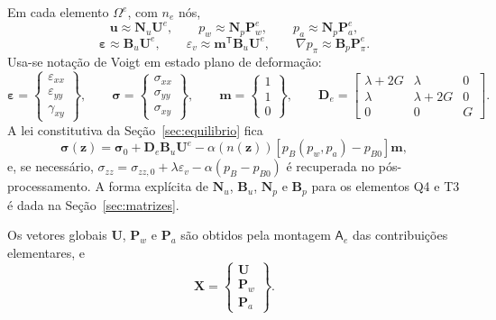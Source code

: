 \documentclass[11pt,a4paper]{article}
\numberwithin{equation}{section}
\begin{document}
Em cada elemento $\Omega^e$, com $n_e$ nós,
\begin{equation}
\boxed{\mathbf u\approx\mathbf N_u\mathbf U^e,\qquad
p_w\approx\mathbf N_p\mathbf P_w^e,\qquad
p_a\approx\mathbf N_p\mathbf P_a^e,}
\end{equation}
\begin{equation}
\boxed{\boldsymbol\varepsilon\approx\mathbf B_u\mathbf U^e,\qquad
\varepsilon_v\approx\mathbf m^{\mathsf T}\mathbf B_u\mathbf U^e,\qquad
\nabla p_\pi\approx\mathbf B_p\mathbf P_\pi^e.}
\end{equation}
Usa-se notação de Voigt em estado plano de deformação:
\begin{equation}
\boldsymbol\varepsilon=\begin{Bmatrix}\varepsilon_{xx}\\ \varepsilon_{yy}\\ \gamma_{xy}\end{Bmatrix},
\qquad
\boldsymbol\sigma=\begin{Bmatrix}\sigma_{xx}\\ \sigma_{yy}\\ \sigma_{xy}\end{Bmatrix},
\qquad
\mathbf m=\begin{Bmatrix}1\\1\\0\end{Bmatrix},
\qquad
\mathbf D_e=\begin{bmatrix}\lambda+2G&\lambda&0\\ \lambda&\lambda+2G&0\\ 0&0&G\end{bmatrix}.
\end{equation}
A lei constitutiva da Seção~\ref{sec:equilibrio} fica
\begin{equation}
\boxed{\boldsymbol\sigma(\mathbf z)=\boldsymbol\sigma_0+\mathbf D_e\mathbf B_u\mathbf U^e
-\alpha(n(\mathbf z))\left[p_B(p_w,p_a)-p_{B0}\right]\mathbf m,}
\end{equation}
e, se necessário, $\sigma_{zz}=\sigma_{zz,0}+\lambda\varepsilon_v-\alpha(p_B-p_{B0})$
é recuperada no pós-processamento. A forma explícita de $\mathbf N_u$,
$\mathbf B_u$, $\mathbf N_p$ e $\mathbf B_p$ para os elementos Q4 e T3
é dada na Seção~\ref{sec:matrizes}.

Os vetores globais $\mathbf U$, $\mathbf P_w$ e $\mathbf P_a$ são obtidos
pela montagem $\mathsf A_e$ das contribuições elementares, e
\begin{equation}
\mathbf X=\begin{Bmatrix}\mathbf U\\ \mathbf P_w\\ \mathbf P_a\end{Bmatrix}.
\end{equation}
\end{document}

